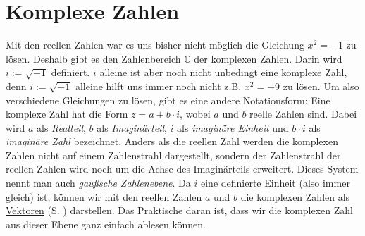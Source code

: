 \documentclass[12pt]{article}
\newcommand{\highlight}[2]{\textcolor{blue}{\hyperref[#1]{#2}} (S. \pageref{#1})}
\begin{document}
	\section{Komplexe Zahlen}
		Mit den reellen Zahlen war es uns bisher nicht möglich die Gleichung $x^2=-1$ zu lösen. Deshalb gibt es den Zahlenbereich $\mathbb{C}$ der komplexen Zahlen. Darin wird $i:=\sqrt{-1}$ definiert. $i$ alleine ist aber noch nicht unbedingt eine komplexe Zahl, denn $i:=\sqrt{-1}$ alleine hilft uns immer noch nicht z.B. $x^2=-9$ zu lösen. Um also verschiedene Gleichungen zu lösen, gibt es eine andere Notationsform: Eine komplexe Zahl hat die Form $z=a+b\cdot i$, wobei $a$ und $b$ reelle Zahlen sind. Dabei wird $a$ als \textit{Realteil}, $b$ als \textit{Imaginärteil}, $i$ als \textit{imaginäre Einheit} und $b\cdot i$ als \textit{imaginäre Zahl} bezeichnet. Anders als die reellen Zahl werden die komplexen Zahlen nicht auf einem Zahlenstrahl dargestellt, sondern der Zahlenstrahl der reellen Zahlen wird noch um die Achse des Imaginärteils erweitert. Dieses System nennt man auch \textit{gaußsche Zahlenebene}. Da $i$ eine definierte Einheit (also immer gleich) ist, können wir mit den reellen Zahlen $a$ und $b$ die komplexen Zahlen als \highlight{sec:vektorgeometrie}{Vektoren} darstellen. Das Praktische daran ist, dass wir die komplexen Zahl aus dieser Ebene ganz einfach ablesen können.
		\begin{center}
		\end{center}
\end{document}
